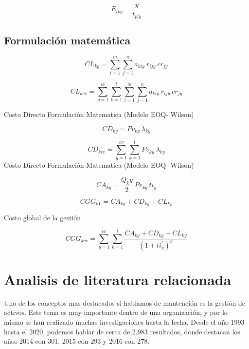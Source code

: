 \documentclass[]{article}
\begin{document}
\begin{equation}
    E_{iky} = \frac{y}{t_{ply}}
\end{equation}

\subsection{Formulación matemática}
\begin{equation}
    CL_{ky} = \sum_{i=1}^{m}\sum_{j=1}^{n} a_{kiy} \ \! r_{ijy}\ \! cr_{jy}
\end{equation}

\begin{equation}
    CL_{kcv} = \sum_{y=1}^{cv}\sum_{k=1}^{t}\sum_{i=1}^{m}\sum_{j=1}^{n} a_{kiy} \ \! r_{ijy}\ \! cr_{jy}
\end{equation}

Costo Directo
Formulación Matematica (Modelo EOQ- Wilson)

\begin{equation}
    CD_{ky} = Pv_{ky} \ \! \lambda_{ky}
\end{equation}

\begin{equation}
    CD_{kcv} = \sum_{y=1}^{cv}\sum_{k=1}^{t} Pv_{ky} \ \! \lambda_{ky}
\end{equation}
Costo Directo
Formulación Matematica (Modelo EOQ- Wilson)

\begin{equation}
    CA_{ky} = \frac{Q_ky}{2} \ \! Pv_{ky} \ \! ti_{y}
\end{equation}

\begin{equation}
    CGG_{kY} = CA_{ky} + CD_{ky} + CL_{ky}
\end{equation}

Costo global de la gestión

\begin{equation}
    CGG_{kcv} = \sum_{y=1}^{cv}\sum_{k=1}^{t}\frac{CA_{ky} + CD_{ky} + CL_{ky}}{{(1 +ti_{y}^{\prime})}^{y}}
\end{equation}




\hypertarget{analisis-literatura-relacionada}{
\section{Analisis de literatura relacionada }
\label{analisis-literatura-relacionada}}

Uno de los conceptos mas destacados si hablamos de mantención es la gestión de activos. Este tema es muy importante dentro de una organización, y por lo mismo se han realizado muchas investigaciones hasta la fecha.
Desde el año 1993 hasta el 2020, podemos hablar de cerca de 2.983 resultados, donde destacan los años 2014 con 301, 2015 con 293 y 2016 con 278.
\end{document}
